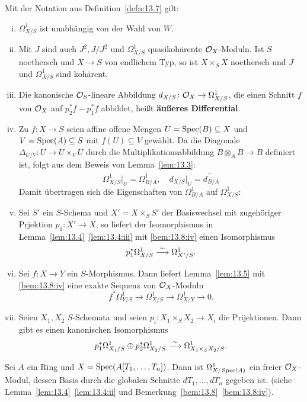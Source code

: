 \begin{bem}
\label{bem:13.8}
	Mit der Notation aus Definition~\ref{defn:13.7} gilt:
	\begin{enumerate}[i)]
		\item\label{bem:13.8:i} $\Omega_{X/S}^1$ ist unabhängig von der Wahl von $W$.
		\item\label{bem:13.8:ii} Mit $J$ sind auch $J^2, J/J^2$ und $\Omega_{X/S}^1$ quasikohärente $\mathcal{O}_X$-Moduln. Ist $S$ noethersch und $X \to S$ von endlichem Typ, so ist $X\times_SX$ noethersch und $J$ und $\Omega_{X/S}^1$ sind kohärent. %
		\item\label{bem:13.8:iii} Die kanonische $\mathcal{O}_S$-lineare Abbildung $d_{X/S}\colon \mathcal{O}_X\to \Omega_{X/S}^1$, die einen Schnitt $f$ von $\mathcal{O}_X$ auf $p_2^*f - p_1^*f$ abbildet, heißt \textbf{äußeres Differential}.
		\item\label{bem:13.8:iv} Zu $f\colon X \to S$ seien affine offene Mengen $U = \operatorname{Spec}(B) \subseteq X$ und $V = \operatorname{Spec}(A) \subseteq S$ mit $f(U) \subseteq V$ gewählt. Da die Diagonale $\Delta_{U/V}\colon U \to U \times_V U$ durch die Multiplikationsabbildung $B\otimes_A B \to B$ definiert ist, folgt aus dem Beweis von Lemma~\ref{lem:13.3}:
		\[
			\Omega_{X/S}^1\vert_{U} = \widetilde{\Omega_{B/A}^1}, \quad d_{X/S}\vert_U = \widetilde{d_{B/A}}
		\]
		Damit übertragen sich die Eigenschaften von $\Omega_{B/A}^1$ auf $\Omega_{X/S}^1$:%
		\item\label{bem:13.8:v} Sei $S'$ ein $S$-Schema und $X' = X \times_S S'$ der Basiswechsel mit zugehöriger Prjektion $p_1\colon X' \to X$, so liefert der Isomorphismus in Lemma~\ref{lem:13.4}~\ref{lem:13.4:iii} mit \ref{bem:13.8:iv} einen Isomorphismus
		\[
			p_1^*\Omega_{X/S}^1 \overset{\sim}{\longrightarrow} \Omega_{X'/S'}^1
		\]%
		\item\label{bem:13.8:vi} Sei $f \colon X \to Y$ ein $S$-Morphismus. Dann liefert Lemma~\ref{lem:13.5} mit \ref{bem:13.8:iv} eine exakte Sequenz von $\mathcal{O}_X$-Moduln
		\[
			f^*\Omega_{Y/S}^1 \to \Omega_{X/S}^1 \to \Omega_{X/Y}^1\to 0.
		\]%
		\item\label{bem:13.8:vii} Seien $X_1, X_2$ $S$-Schemata und seien $p_i\colon X_1\times_S X_2 \to X_i$ die Prijektionen. Dann gibt es einen kanonischen Isomorphismus
		\[
			p_1^*\Omega_{X_1/S}^1 \oplus p_2^*\Omega_{X_2/S}^1 \overset{\sim}{\longrightarrow} \Omega_{X_1 \times_S X_2 / S}^1.
		\]
	\end{enumerate}
\end{bem}

\begin{bsp}
\label{bsp:13.9}
	Sei $A$ ein Ring und $X=\operatorname{Spec}(A[T_1,\ldots,T_n])$. Dann ist $\Omega_{X/\operatorname{Spec}(A)}^1$ ein freier $\mathcal{O}_X$-Modul, dessen Basis durch die globalen Schnitte $dT_1,\ldots,dT_n$ gegeben ist. (siehe Lemma~\ref{lem:13.4}~\ref{lem:13.4:ii} und Bemerkung~\ref{bem:13.8}~\ref{bem:13.8:iv}).
\end{bsp}

